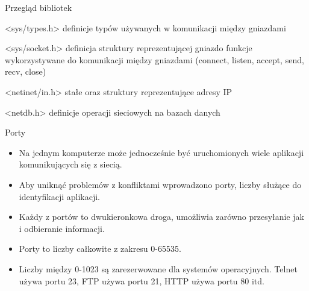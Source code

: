 \documentclass[notheorems, aspectratio=54]{beamer}
\begin{document}
\begin{frame}
Przegląd bibliotek

<sys/types.h>
definicje typów używanych w komunikacji między gniazdami

<sys/socket.h>
definicja struktury reprezentującej gniazdo
funkcje wykorzystywane do komunikacji między gniazdami (connect, listen, accept, send, recv, close) 

<netinet/in.h>
stałe oraz struktury reprezentujące adresy IP

<netdb.h>
definicje operacji sieciowych na bazach danych

\end{frame}

\begin{frame}
Porty

\begin{itemize}
\item Na jednym komputerze może jednocześnie być uruchomionych wiele aplikacji komunikujących się z siecią.
\item Aby uniknąć problemów z konfliktami wprowadzono porty, liczby służące do identyfikacji aplikacji.
\item Każdy z portów to dwukieronkowa droga, umożliwia zarówno przesyłanie jak i odbieranie informacji.
\item Porty to liczby całkowite z zakresu 0-65535.
\item Liczby między 0-1023 są zarezerwowane dla systemów operacyjnych. Telnet używa portu 23, FTP używa portu 21, HTTP używa portu 80 itd.
\end{itemize}

\end{frame}
\end{document}
